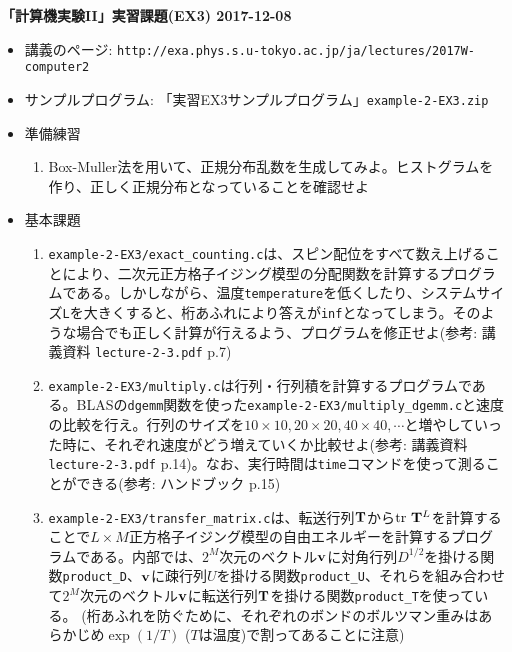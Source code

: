 \documentclass[11pt]{jarticle}
\begin{document}
\noindent
{\bf\large 「計算機実験II」実習課題(EX3) 2017-12-08}
\\[-0.5em]

\noindent
\begin{itemize}
\item 講義のページ: \verb+http://exa.phys.s.u-tokyo.ac.jp/ja/lectures/2017W-computer2+

\item サンプルプログラム: 「実習EX3サンプルプログラム」{\tt example-2-EX3.zip}

\item 準備練習
  
\begin{enumerate}
\item Box-Muller法を用いて、正規分布乱数を生成してみよ。ヒストグラムを作り、正しく正規分布となっていることを確認せよ
\end{enumerate}

\item 基本課題
  \begin{enumerate}
  \item {\tt example-2-EX3/exact\_counting.c}は、スピン配位をすべて数え上げることにより、二次元正方格子イジング模型の分配関数を計算するプログラムである。しかしながら、温度{\tt temperature}を低くしたり、システムサイズ{\tt L}を大きくすると、桁あふれにより答えが{\tt inf}となってしまう。そのような場合でも正しく計算が行えるよう、プログラムを修正せよ(参考: 講義資料 {\tt lecture-2-3.pdf} p.7)
  \item {\tt example-2-EX3/multiply.c}は行列・行列積を計算するプログラムである。BLASの{\tt dgemm}関数を使った{\tt example-2-EX3/multiply\_dgemm.c}と速度の比較を行え。行列のサイズを$10 \times 10, 20 \times 20, 40 \times 40, \cdots$と増やしていった時に、それぞれ速度がどう増えていくか比較せよ(参考: 講義資料 {\tt lecture-2-3.pdf} p.14)。なお、実行時間は{\tt time}コマンドを使って測ることができる(参考: ハンドブック p.15)
  \item {\tt example-2-EX3/transfer\_matrix.c}は、転送行列${\bf T}$から${\rm tr}\ {\bf T}^L$を計算することで$L \times M$正方格子イジング模型の自由エネルギーを計算するプログラムである。内部では、$2^M$次元のベクトル${\bf v}$に対角行列$D^{1/2}$を掛ける関数{\tt product\_D}、${\bf v}$に疎行列$U$を掛ける関数{\tt product\_U}、それらを組み合わせて$2^M$次元のベクトル${\bf v}$に転送行列${\bf T}$を掛ける関数{\tt product\_T}を使っている。 (桁あふれを防ぐために、それぞれのボンドのボルツマン重みはあらかじめ$\exp(1/T)$ ($T$は温度)で割ってあることに注意)


\end{enumerate}
\end{itemize}
\end{document}
